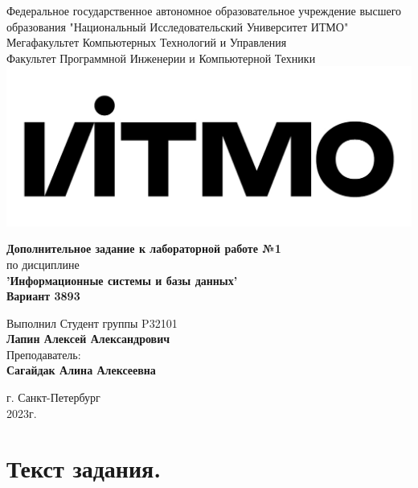 \documentclass[12pt,onecolumn]{article}
\begin{document}
\setcounter{tocdepth}{4}
\begin{center}
    Федеральное государственное автономное образовательное учреждение высшего образования "Национальный Исследовательский Университет ИТМО"\\ 
    Мегафакультет Компьютерных Технологий и Управления\\
    Факультет Программной Инженерии и Компьютерной Техники \\
    \includegraphics[scale=0.3]{image/itmo.jpg} %
\end{center}
\vspace{1cm}


\begin{center}
    \textbf{Дополнительное задание к лабораторной работе №1}\\
    по дисциплине\\
    \textbf{'Информационные системы и базы данных'}\\
    \textbf{Вариант 3893}
\end{center}

\vspace{2cm}

\begin{flushright}
  Выполнил Студент  группы P32101\\
  \textbf{Лапин Алексей Александрович}\\
  Преподаватель: \\
  \textbf{Сагайдак Алина Алексеевна}\\
\end{flushright}

\vspace{6cm}
\begin{center}
    г. Санкт-Петербург\\
    2023г.
\end{center}

\newpage
\tableofcontents
\newpage

\section{Текст задания.}
\end{document}

